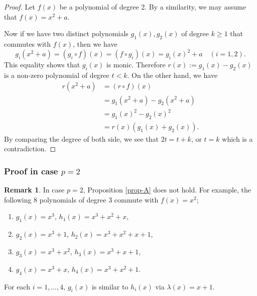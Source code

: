 \documentclass[a4paper, 11pt]{amsart}
\numberwithin{equation}{section}
\theoremstyle{definition}
\newtheorem{rmk}[thm]{Remark}
\begin{document}
\begin{proof}
Let $f(x)$ be a polynomial of degree 2.
By a similarity, we may assume that $f(x)=x^2+a$.

Now if we have two distinct polynomials $g_1(x), g_2(x)$ of degree $k\geq 1$ that commutes with $f(x)$, then we have
\[
g_i(x^2+a)=(g_i\circ f)(x)=(f\circ g_i)(x)=g_i(x)^2+a\quad (i=1,2).
\]
This equality shows that $g_i(x)$ is monic.
Therefore $r(x):=g_1(x)-g_2(x)$ is a non-zero polynomial of degree $t<k$.
On the other hand, we have
\begin{align*}
r(x^2+a)
&=
(r\circ f)(x)\\
&=g_1(x^2+a)-g_2(x^2+a)\\
&=g_1(x)^2-g_2(x)^2\\
&=r(x)(g_1(x)+g_2(x)).
\end{align*}
By comparing the degree of both side, we see that $2t=t+k$, or $t=k$ which is a contradiction.
\end{proof}

\subsubsection{Proof in case $p=2$}

\begin{rmk}
In case $p=2$, Proposition \ref{prop-A} does not hold.
For example, the following 8 polynomials of degree 3 commute with $f(x)=x^2$;
\begin{enumerate}
\item
$g_1(x)=x^3$, $h_1(x)=x^3+x^2+x$,
\item
$g_2(x)=x^3+1$,  $h_2(x)=x^3+x^2+x+1$,
\item
$g_3(x)=x^3+x^2$, $h_3(x)=x^3+x+1$,
\item
$g_4(x)=x^3+x$,  $h_4(x)=x^3+x^2+1$.
\end{enumerate}
For each $i=1,\dots,4$, $g_i(x)$ is similar to $h_i(x)$ via $\lambda(x)=x+1$.
\end{rmk}
\end{document}
